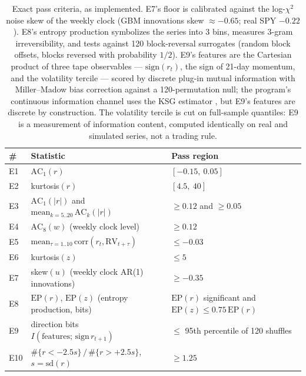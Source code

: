 \documentclass[11pt]{article}
\begin{document}
\begin{table}[t]
\centering\small
\begin{tabular}{llp{6.1cm}}
\toprule
\# & Statistic & Pass region \\
\midrule
E1 & $\mathrm{AC}_1(r)$ & $[-0.15,\ 0.05]$ \\
E2 & kurtosis$(r)$ & $[4.5,\ 40]$ \\
E3 & $\mathrm{AC}_1(|r|)$ and $\mathrm{mean}_{k=5..20}\,\mathrm{AC}_k(|r|)$ & $\ge 0.12$ and $\ge 0.05$ \\
E4 & $\mathrm{AC}_8(w)$ (weekly clock level) & $\ge 0.12$ \\
E5 & $\mathrm{mean}_{\tau=1..10}\,\mathrm{corr}(r_t, \mathrm{RV}_{t+\tau})$ & $\le -0.03$ \\
E6 & kurtosis$(z)$ & $\le 5$ \\
E7 & skew$(u)$ (weekly clock AR(1) innovations) & $\ge -0.35$ \\
E8 & $\mathrm{EP}(r)$, $\mathrm{EP}(z)$ (entropy production, bits) & $\mathrm{EP}(r)$ significant and $\mathrm{EP}(z) \le 0.75\,\mathrm{EP}(r)$ \\
E9 & direction bits $I(\text{features};\, \mathrm{sign}\, r_{t+1})$ & $\le$ 95th percentile of 120 shuffles \\
E10 & $\#\{r < -2.5 s\} \,/\, \#\{r > +2.5 s\}$, $s = \mathrm{sd}(r)$ & $\ge 1.25$ \\
\bottomrule
\end{tabular}
\caption{Exact pass criteria, as implemented. E7's floor is calibrated
against the log-$\chi^2$ noise skew of the weekly clock (GBM innovations skew
$\approx -0.65$; real SPY $-0.22$). E8's entropy production symbolizes the
series into 3 bins, measures 3-gram irreversibility, and tests against 120
block-reversal surrogates (random block offsets, blocks reversed with
probability $1/2$). E9's features are the Cartesian product of three tape
observables --- $\mathrm{sign}(r_t)$, the sign of 21-day momentum, and the
volatility tercile --- scored by discrete plug-in mutual information with
Miller--Madow bias correction \citep[see][]{paninski2003} against a
120-permutation null; the program's
continuous information channel uses the KSG estimator \citep{kraskov2004},
but E9's features are discrete by construction. The volatility tercile is cut
on full-sample quantiles: E9 is a measurement of information content,
computed identically on real and simulated series, not a trading rule.}
\label{tab:thresholds}
\end{table}
\end{document}
